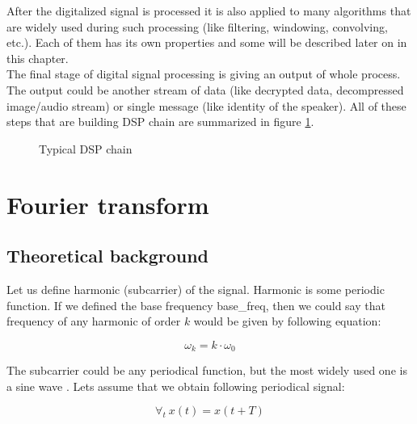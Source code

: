 \documentclass[magister]{dyplom}
\begin{document}
	After the digitalized signal is processed it is also applied to many algorithms that are widely used during such processing (like filtering, windowing, convolving, etc.). Each of them has its own properties and some will be described later on in this chapter.\\
	
	The final stage of digital signal processing is giving an output of whole process. The output could be another stream of data (like decrypted data, decompressed image/audio stream) or single message (like identity of the speaker). All of these steps that are building \gls{DSP} chain are summarized in figure \ref{fig:typical_dsp_chain}.
	
	\begin{figure}[!th]
	\centering


	\caption{Typical DSP chain}
	\label{fig:typical_dsp_chain}
	\end{figure}
	
	\section{Fourier transform}
	
	\subsection{Theoretical background}
	
	Let us define harmonic (subcarrier) of the signal. Harmonic is some periodic function. If we defined the base frequency \gls{base_freq}, then we could say that frequency of any harmonic of order $k$ would be given by following equation:
	
	\begin{equation}	
		\omega_k = k \cdot \omega_0
	\end{equation}
	
	
	The subcarrier could be any periodical function, but the most widely used one is a sine wave \cite{IntroductionDSPBook}. Lets assume that we obtain following periodical signal:
	
	\begin{equation}
		\forall_t \  x(t) = x(t + T)
	\end{equation}
	
\end{document}
